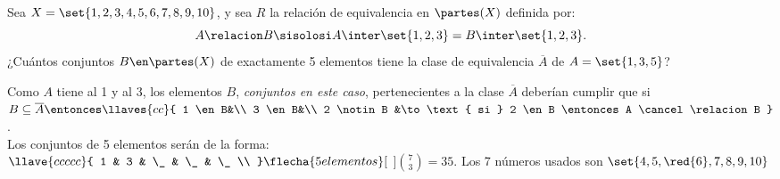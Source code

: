 \begin{enunciado}{\ejercicio}
  Sea $X = \set{1,2,3,4,5,6,7,8,9,10}$, y sea $R$ la relación de equivalencia en $\partes(X)$ definida por:
  $$
    A \relacion B \sisolosi A \inter \set{1,2,3} = B \inter \set{1,2,3}.
  $$
  ¿Cuántos conjuntos $B \en \partes(X)$ de exactamente 5 elementos tiene la clase de equivalencia $\overline A $ de $A = \set{1,3,5}$?
\end{enunciado}

Como $A$ tiene al 1 y al 3, los elementos $B$, \textit{conjuntos en este caso}, pertenecientes a la clase $\overline A$
deberían cumplir que si $B \subseteq \overline A \entonces
  \llaves{cc}{
    1 \en B&\\
    3 \en B&\\
    2 \notin B &\to \text{ si } 2 \en B \entonces A \cancel\relacion B
  } $.\\
Los conjuntos de 5 elementos serán de la forma:\\
$\llave{c c c c c} %
  {
    1 & 3 & \_ & \_ & \_ \\
  } \flecha{5 elementos}[$ \inter {} \igual{\checkmark} $] \binom{7}{3} = 35$. Los 7 números usados son $\set{4,5,\red{6},7,8,9,10}$ \\
